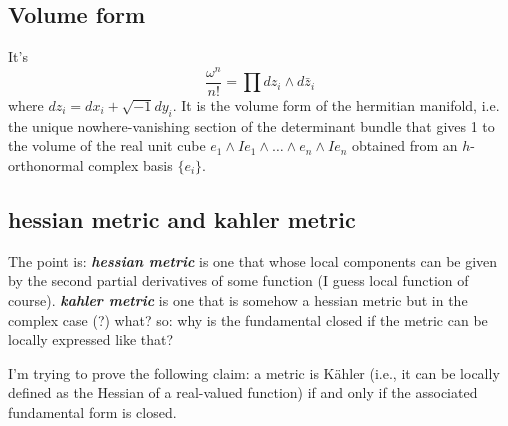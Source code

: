 \subsection{Volume form}
It's
\[\frac{\omega^n}{n!}=\prod dz_i \wedge d\bar{z}_i\]
where \(dz_i=dx_i + \sqrt{-1}dy_i\). It is the volume form of the hermitian manifold, i.e. the unique nowhere-vanishing section of the determinant bundle that gives 1 to the volume of the real unit cube \(e_1 \wedge Ie_1\wedge\ldots\wedge e_n \wedge I e_n\) obtained from an \(h\)-orthonormal complex basis \(\{e_i\}\).

\subsection{hessian metric and kahler metric}

The point is: \textit{\textbf{hessian metric}} is one that whose local components can be given by the second partial derivatives of some function (I guess local function of course). \textit{\textbf{kahler metric}} is one that is somehow a hessian metric but in the complex case (?) what? so: why is the fundamental closed if the metric can be locally expressed like that?

\begin{exercise}\leavevmode
I’m trying to prove the following claim: a metric is Kähler (i.e., it can be locally defined as the Hessian of a real-valued function) if and only if the associated fundamental form is closed.
\end{exercise}

